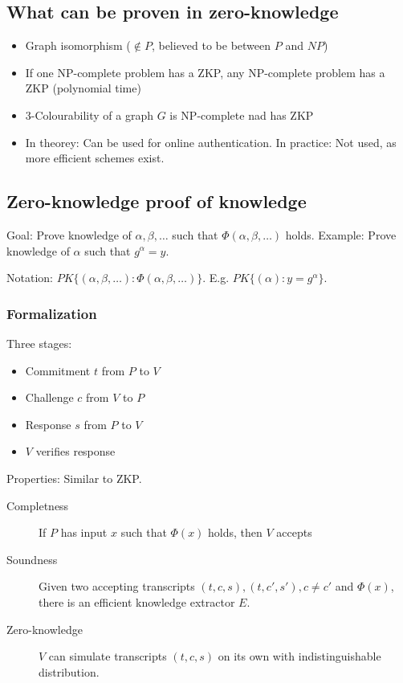 \subsection{What can be proven in zero-knowledge}

\begin{itemize}
		\item Graph isomorphism ($\not \in P$, believed to be between $P$ and
				$NP$)
		\item If one NP-complete problem has a ZKP, any NP-complete problem has
				a ZKP (polynomial time)
		\item 3-Colourability of a graph $G$ is NP-complete nad has ZKP
		\item In theorey: Can be used for online authentication. In practice:
				Not used, as more efficient schemes exist.
\end{itemize}

\subsection{Zero-knowledge proof of knowledge}

Goal: Prove knowledge of $\alpha, \beta, \ldots$ such that $\Phi(\alpha, \beta,
\ldots)$ holds. Example: Prove knowledge of $\alpha$ such that $g^\alpha = y$.

Notation: $PK\{(\alpha, \beta, \ldots) : \Phi(\alpha, \beta, \ldots)\}$. E.g.
$PK\{(\alpha) : y = g^\alpha\}$.

\subsubsection{Formalization}

Three stages:
\begin{itemize}
		\item Commitment $t$ from $P$ to $V$
		\item Challenge $c$ from $V$ to $P$
		\item Response $s$ from $P$ to $V$
		\item $V$ verifies response
\end{itemize}

Properties: Similar to ZKP.
\begin{description}
		\item[Completness] If $P$ has input $x$ such that $\Phi(x)$ holds, then
				$V$ accepts
		\item[Soundness] Given two accepting transcripts $(t, c, s), (t, c',
				s'), c \neq c'$ and $\Phi(x)$, there is an efficient knowledge
				extractor $E$.
		\item[Zero-knowledge] $V$ can simulate transcripts $(t, c, s)$ on its
				own with indistinguishable distribution.
\end{description}

